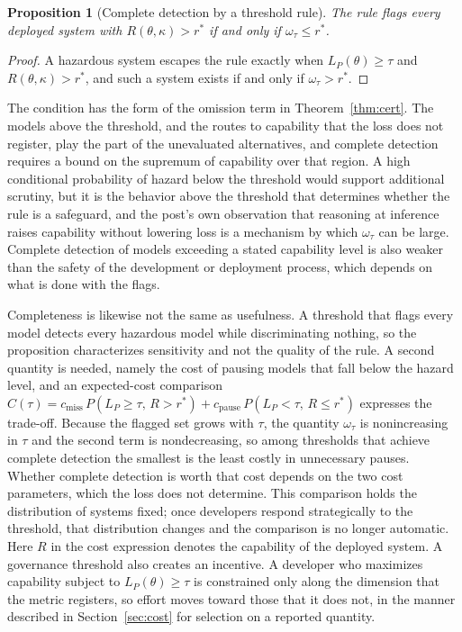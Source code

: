 \documentclass[11pt]{article}
\newtheorem{proposition}{Proposition}
\theoremstyle{definition}
\theoremstyle{remark}
\begin{document}
\begin{proposition}[Complete detection by a threshold rule]
\label{prop:threshold}
The rule flags every deployed system with $R(\theta,\kappa)>r^{*}$ if and only if $\omega_\tau\le r^{*}$.
\end{proposition}

\begin{proof}
A hazardous system escapes the rule exactly when $L_P(\theta)\ge\tau$ and $R(\theta,\kappa)>r^{*}$, and such a system exists if and only if $\omega_\tau>r^{*}$.
\end{proof}

The condition has the form of the omission term in Theorem~\ref{thm:cert}. The models above the threshold, and the routes to capability that the loss does not register, play the part of the unevaluated alternatives, and complete detection requires a bound on the supremum of capability over that region. A high conditional probability of hazard below the threshold would support additional scrutiny, but it is the behavior above the threshold that determines whether the rule is a safeguard, and the post's own observation that reasoning at inference raises capability without lowering loss is a mechanism by which $\omega_\tau$ can be large. Complete detection of models exceeding a stated capability level is also weaker than the safety of the development or deployment process, which depends on what is done with the flags.

Completeness is likewise not the same as usefulness. A threshold that flags every model detects every hazardous model while discriminating nothing, so the proposition characterizes sensitivity and not the quality of the rule. A second quantity is needed, namely the cost of pausing models that fall below the hazard level, and an expected-cost comparison $C(\tau)=c_{\mathrm{miss}}\,P(L_P\ge\tau,\,R>r^{*})+c_{\mathrm{pause}}\,P(L_P<\tau,\,R\le r^{*})$ expresses the trade-off. Because the flagged set grows with $\tau$, the quantity $\omega_\tau$ is nonincreasing in $\tau$ and the second term is nondecreasing, so among thresholds that achieve complete detection the smallest is the least costly in unnecessary pauses. Whether complete detection is worth that cost depends on the two cost parameters, which the loss does not determine. This comparison holds the distribution of systems fixed; once developers respond strategically to the threshold, that distribution changes and the comparison is no longer automatic. Here $R$ in the cost expression denotes the capability of the deployed system. A governance threshold also creates an incentive. A developer who maximizes capability subject to $L_P(\theta)\ge\tau$ is constrained only along the dimension that the metric registers, so effort moves toward those that it does not, in the manner described in Section~\ref{sec:cost} for selection on a reported quantity.
\end{document}
